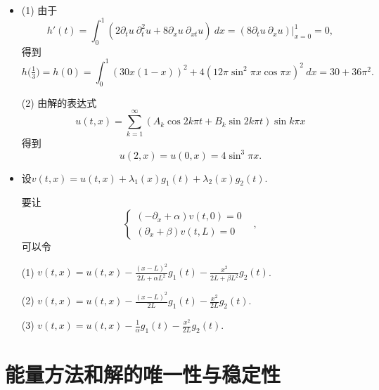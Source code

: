 \begin{itemize}
\item[4.] (1) 由于$$h'(t)
=\int_0^1 (2\partial_tu\>\partial^2_tu+8\partial_xu\>\partial_{xt}u)\>dx
=(8\partial_tu\>\partial_xu)|_{x=0}^1=0,$$
得到$$h\big(\tfrac{1}{3}\big)=h(0)
=\int_0^1 (30x(1-x))^2+4(12\pi\sin^2\pi x\cos\pi x)^2\>dx
=30+36\pi^2.$$

(2) 由解的表达式
$$u(t,x)=\sum_{k=1}^\infty(A_k\cos 2k\pi t+B_k\sin 2k\pi t)\sin k\pi x$$
得到
$$u(2,x)=u(0,x)=4\sin^3\pi x.$$

\item[5.] 设$v(t,x)=u(t,x)+\lambda_1(x)g_1(t)+\lambda_2(x)g_2(t)$.

要让\begin{equation*}
    \left\{\begin{aligned}
        (-\partial_x+\alpha)v(t,0)=0&\\
        (\partial_x+\beta)v(t,L)=0&
    \end{aligned}\right.,
\end{equation*}
可以令

(1) $v(t,x)=u(t,x)-\frac{(x-L)^2}{2L+\alpha L^2}g_1(t)-\frac{x^2}{2L+\beta L^2}g_2(t)$.

(2) $v(t,x)=u(t,x)-\frac{(x-L)^2}{2L}g_1(t)-\frac{x^2}{2L}g_2(t)$.

(3) $v(t,x)=u(t,x)-\frac{1}{\alpha}g_1(t)-\frac{x^2}{2L}g_2(t)$.
\end{itemize}

\section{能量方法和解的唯一性与稳定性}

